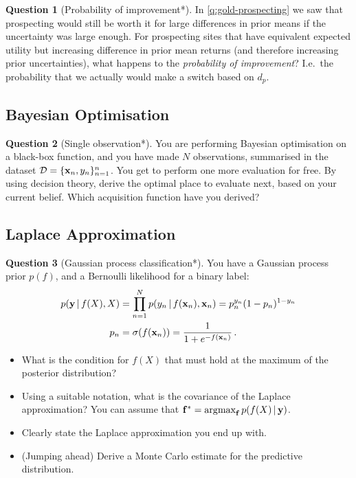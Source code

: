 \documentclass[a4paper]{article}
\theoremstyle{definition}
\newtheorem{question}{Question}
\begin{document}
\begin{question}[Probability of improvement*]
\label{q:prob-improv}
In \cref{q:gold-prospecting} we saw that prospecting would still be worth it for large differences in prior means if the uncertainty was large enough. For prospecting sites that have equivalent expected utility but increasing difference in prior mean returns (and therefore increasing prior uncertainties), what happens to the \emph{probability of improvement}? I.e.~the probability that we actually would make a switch based on $d_p$.
\end{question}


\subsection{Bayesian Optimisation}
\begin{question}[Single observation*]
\label{q:single-obs-bo}
You are performing Bayesian optimisation on a black-box function, and you have made $N$ observations, summarised in the dataset $\mathcal{D} = \{\mathbf{x}_n, y_n\}_{n=1}^n$. You get to perform one more evaluation for free. By using decision theory, derive the optimal place to evaluate next, based on your current belief. Which acquisition function have you derived?
\end{question}



\subsection{Laplace Approximation}
\begin{question}[Gaussian process classification*]
\label{q:laplace-gpc}
You have a Gaussian process prior $p(f)$, and a Bernoulli likelihood for a binary label:
\begin{align}
p(\mathbf{y}\,|\, f(X), X) &= \prod_{n=1}^N p(y_n\,|\, f(\mathbf{x}_n), \mathbf{x}_n) = p_n^{y_n}(1-p_n)^{1 - y_n} \\
p_n &= \sigma(f(\mathbf{x}_n)) = \frac{1}{1 + e^{-f(\mathbf{x}_n)}} \,.
\end{align}
\begin{itemize}
\item What is the condition for $f(X)$ that must hold at the maximum of the posterior distribution?
\item Using a suitable notation, what is the covariance of the Laplace approximation? You can assume that $\mathbf{f}^* = \operatorname*{\arg\!\max}_{\mathbf{f}} p(f(X)\,|\, \mathbf{y})$.
\item Clearly state the Laplace approximation you end up with.
\item (Jumping ahead) Derive a Monte Carlo estimate for the predictive distribution.
\end{itemize}
\end{question}
\end{document}
